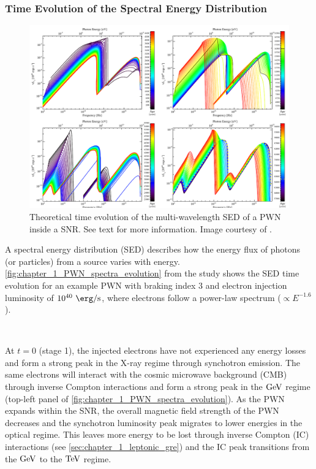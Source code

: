 \subsubsection{Time Evolution of the Spectral Energy Distribution}

\begin{figure}[h!]
    \centering
    \includegraphics[width=\textwidth]{04_Introduction/Images/pulsar_wind_nebula/pwn_spectra_evolution.pdf}
    \caption{Theoretical time evolution of the multi-wavelength SED of a PWN inside a SNR. See text for more information. Image courtesy of \cite{2009ApJ...703.2051G}.}
    \label{fig:chapter_1_PWN_spectra_evolution}
\end{figure}
A spectral energy distribution (SED) describes how the energy flux of photons (or particles) from a source varies with energy. \autoref{fig:chapter_1_PWN_spectra_evolution} from the study \cite{2009ApJ...703.2051G} shows the SED time evolution for an example PWN with braking index $3$ and electron injection luminosity of $10^{40}~\ergspersec$, where electrons follow a power-law spectrum ($\propto E^{-1.6}$).
\par~\par
At $t=0$ (stage 1), the injected electrons have not experienced any energy losses and form a strong peak in the X-ray regime through synchotron emission. The same electrons will interact with the cosmic microwave background (CMB) through inverse Compton interactions and form a strong peak in the $\si{\giga\electronvolt}$ regime  (top-left panel of \autoref{fig:chapter_1_PWN_spectra_evolution}). As the PWN expands within the SNR, the overall magnetic field strength of the PWN decreases and the synchotron luminosity peak migrates to lower energies in the optical regime. This leaves more energy to be lost through inverse Compton (IC) interactions (see \autoref{sec:chapter_1_leptonic_gre}) and the IC peak transitions from the $\si{\giga\electronvolt}$ to the $\TeV$ regime.
